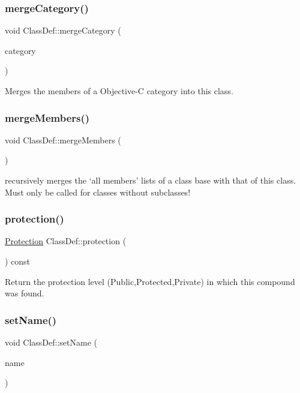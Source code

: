 \subsubsection{\texorpdfstring{mergeCategory()}{mergeCategory()}}
{\footnotesize\ttfamily void Class\+Def\+::merge\+Category (\begin{DoxyParamCaption}\item[{\mbox{\hyperlink{class_class_def}{Class\+Def}} $\ast$}]{category }\end{DoxyParamCaption})}

Merges the members of a Objective-\/C category into this class. \mbox{\label{class_class_def_a91edf0e1d111bb5b90561af28ec93409}} 
\subsubsection{\texorpdfstring{mergeMembers()}{mergeMembers()}}
{\footnotesize\ttfamily void Class\+Def\+::merge\+Members (\begin{DoxyParamCaption}{ }\end{DoxyParamCaption})}

recursively merges the `all members' lists of a class base with that of this class. Must only be called for classes without subclasses! \mbox{\label{class_class_def_a013bf8c79e1db7c5314e53855ee95260}} 
\subsubsection{\texorpdfstring{protection()}{protection()}}
{\footnotesize\ttfamily \mbox{\hyperlink{types_8h_a90e352184df58cd09455fe9996cd4ded}{Protection}} Class\+Def\+::protection (\begin{DoxyParamCaption}{ }\end{DoxyParamCaption}) const}

Return the protection level (Public,Protected,Private) in which this compound was found. \mbox{\label{class_class_def_a3e64e04797c5b3e0c8d3f83ed9f606df}} 
\subsubsection{\texorpdfstring{setName()}{setName()}}
{\footnotesize\ttfamily void Class\+Def\+::set\+Name (\begin{DoxyParamCaption}\item[{const char $\ast$}]{name }\end{DoxyParamCaption})\hspace{0.3cm}{\ttfamily [virtual]}}

